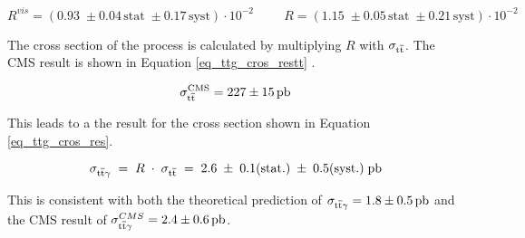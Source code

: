 \begin{equation}
R^{vis} = (0.93 \;\pm 0.04\,\mathrm{stat}\;\pm 0.17\,\mathrm{syst})\cdot 10^{-2} \hspace{1cm} R = (1.15 \;\pm 0.05\,\mathrm{stat}\;\pm 0.21\,\mathrm{syst})\cdot 10^{-2}
\label{eq_ttg_cros_Rres}
\end{equation}

The cross section of the \ttgamma process is calculated by multiplying $R$ with $\sigma_{\mathrm{t}\overline{\mathrm{t}}}$. The CMS result is shown in Equation \ref{eq_ttg_cros_restt} \cite{CMS-PAS-TOP-12-007} .

\begin{equation}
\sigma_{\ttbar}^{\mathrm{CMS}} = \SI{227 \pm 15}{\pico \barn}
\label{eq_ttg_cros_restt}
\end{equation}

This leads to a the result for the \ttgamma cross section shown in Equation \ref{eq_ttg_cros_res}.

\begin{equation}
\sigma_{\ttgamma} \;=\; R\;\cdot \;\sigma_{\ttbar} \; =\; 2.6\;\pm \;0.1\mathrm{ (stat.)} \;\pm \;0.5\mathrm{ (syst.)}\; \SI{}{\pico \barn}
\label{eq_ttg_cros_restt}
\end{equation}

This is consistent with both the theoretical prediction of $\sigma_{\ttgamma} = \SI{1.8 \pm 0.5}{\pico \barn}$ and the CMS result of $\sigma_{\ttgamma}^{CMS} = \SI{2.4\pm 0.6}{\pico \barn}$.